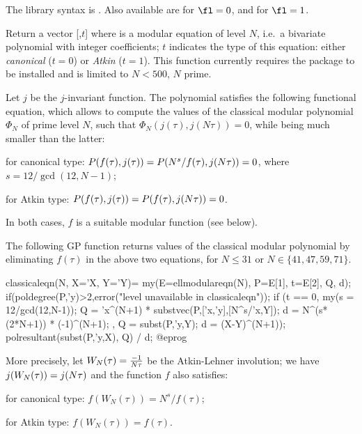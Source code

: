 The library syntax is .
Also available are
 for $\fl=0$, and
 for $\fl=1$.

\label{se:ellmodulareqn}
Return a vector [,$t$] where  is a modular equation of
level $N$, i.e.~a bivariate polynomial with integer coefficients; $t$
indicates the type of this equation: either \emph{canonical} ($t = 0$) or
\emph{Atkin} ($t = 1$). This function currently requires the package
 to be installed and is limited to $N<500$, $N$ prime.

Let $j$ be the $j$-invariant function. The polynomial  satisfies
the following functional equation, which allows to compute the values of the
classical modular polynomial $\Phi_N$ of prime level $N$, such that
$\Phi_N(j(\tau), j(N\tau)) = 0$, while being much smaller than the latter:

\item for canonical type:
 $P(f(\tau),j(\tau)) = P(N^s/f(\tau),j(N\*\tau)) = 0$,
 where $s = 12/\gcd(12,N-1)$;

\item for Atkin type:
 $P(f(\tau),j(\tau)) = P(f(\tau),j(N\*\tau)) = 0$.

\noindent In both cases, $f$ is a suitable modular function (see below).

The following GP function returns values of the classical modular polynomial
by eliminating $f(\tau)$ in the above two equations, for $N\leq 31$ or
$N\in\{41,47,59,71\}$.

\bprog
classicaleqn(N, X='X, Y='Y)=
{
  my(E=ellmodulareqn(N), P=E[1], t=E[2], Q, d);
  if(poldegree(P,'y)>2,error("level unavailable in classicaleqn"));
  if (t == 0,
    my(s = 12/gcd(12,N-1));
    Q = 'x^(N+1) * substvec(P,['x,'y],[N^s/'x,Y]);
    d = N^(s*(2*N+1)) * (-1)^(N+1);
  ,
    Q = subst(P,'y,Y);
    d = (X-Y)^(N+1));
  polresultant(subst(P,'y,X), Q) / d;
}
@eprog

More precisely, let $W_N(\tau)={{-1}\over{N\*\tau}}$ be the Atkin-Lehner
involution; we have $j(W_N(\tau)) = j(N\*\tau)$ and the function $f$ also
satisfies:

\item for canonical type:
   $f(W_N(\tau)) = N^s/f(\tau)$;

\item for Atkin type:
   $f(W_N(\tau)) = f(\tau)$.


